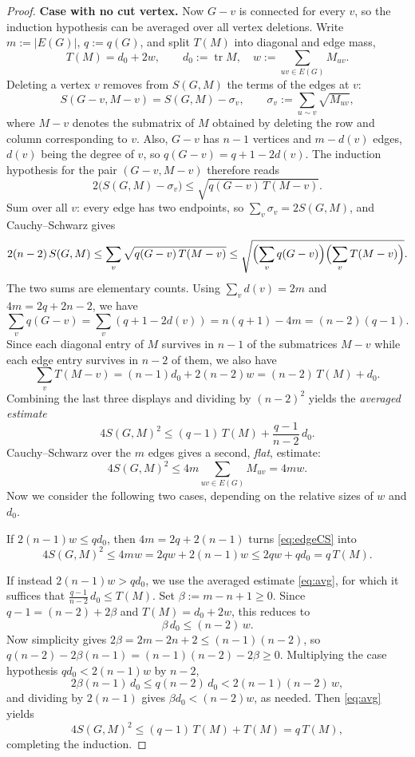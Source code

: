 \documentclass[11pt,letterpaper,reqno]{amsart}
\theoremstyle{definition}
\newcommand{\tr}{\operatorname{tr}}
\newcommand{\ppar}[1]{\par\addvspace{\medskipamount}\noindent{\bfseries #1.}\enspace\ignorespaces}
\begin{document}
\begin{proof}
\medskip
\noindent\textbf{Case with no cut vertex.}
Now $G-v$ is connected for every $v$, so the induction hypothesis can
be averaged over all vertex deletions.  Write $m:=|E(G)|$, $q:=q(G)$,
and split $T(M)$ into diagonal and edge mass,
\[
    T(M)=d_0+2w,
    \qquad
    d_0:=\tr M,
    \quad
    w:=\sum_{uv\in E(G)}M_{uv}.
\]
Deleting a vertex $v$ removes from $S(G,M)$ the terms of the edges at
$v$:
\[
    S(G-v,M-v)=S(G,M)-\sigma_v,
    \qquad
    \sigma_v:=\sum_{u\sim v}\sqrt{M_{uv}},
\]
where $M-v$ denotes the submatrix of $M$ obtained by deleting the row and column corresponding to $v$.  Also, $G-v$ has $n-1$
vertices and $m-d(v)$ edges, $d(v)$ being the degree of $v$, so
$q(G-v)=q+1-2d(v)$.  The induction hypothesis for the pair
$(G-v,M-v)$ therefore reads
\[
    2\bigl(S(G,M)-\sigma_v\bigr)\le\sqrt{q(G-v)\,T(M-v)}.
\]
Sum over all $v$: every edge has two endpoints, so
$\sum_v\sigma_v=2S(G,M)$, and Cauchy--Schwarz gives
\[
    2(n-2)\,S(G,M)
    \le\sum_v\sqrt{q(G-v)\,T(M-v)}
    \le\sqrt{\Bigl(\sum_v q(G-v)\Bigr)\Bigl(\sum_v T(M-v)\Bigr)}.
\]
The two sums are elementary counts.  Using $\sum_v d(v)=2m$ and
$4m=2q+2n-2$, we have
\[
    \sum_v q(G-v)= \sum_v (q + 1 - 2d(v)) = n(q+1)-4m=(n-2)(q-1).
\]
Since each diagonal entry of $M$ survives in $n-1$ of the
submatrices $M-v$ while each edge entry survives in $n-2$ of them, we also have
\[
    \sum_v T(M-v)=(n-1)d_0+2(n-2)w=(n-2)\,T(M)+d_0.
\]
Combining the last three displays and dividing by $(n-2)^2$ yields the
\emph{averaged estimate}
\begin{equation}\label{eq:avg}
    4S(G,M)^2\le(q-1)\,T(M)+\frac{q-1}{n-2}\,d_0.
\end{equation}
Cauchy--Schwarz over the $m$ edges gives a second, \emph{flat},
estimate:
\begin{equation}\label{eq:edgeCS}
    4S(G,M)^2\le4m\sum_{uv\in E(G)}M_{uv}=4mw.
\end{equation}
Now we consider the following two cases, depending on the relative sizes of $w$ and $d_0$.
\ppar{Case 1} If $2(n-1)w\le qd_0$, then $4m=2q+2(n-1)$ turns \eqref{eq:edgeCS} into
\[
    4S(G,M)^2\le4mw=2qw+2(n-1)w\le2qw+qd_0=q\,T(M).
\]
\ppar{Case 2} If instead $2(n-1)w>qd_0$, we use the averaged
estimate \eqref{eq:avg}, for which it suffices that
$\frac{q-1}{n-2}\,d_0\le T(M)$.  Set $\beta:=m-n+1\ge0$.  Since
$q-1=(n-2)+2\beta$ and $T(M)=d_0+2w$, this reduces to
\[
    \beta\,d_0\le(n-2)\,w.
\]
Now simplicity gives $2\beta=2m-2n+2\le(n-1)(n-2)$, so
$q(n-2)-2\beta(n-1)=(n-1)(n-2)-2\beta\ge0$.  Multiplying the case
hypothesis $qd_0<2(n-1)w$ by $n-2$,
\[
    2\beta(n-1)\,d_0\le q(n-2)\,d_0<2(n-1)(n-2)\,w,
\]
and dividing by $2(n-1)$ gives $\beta d_0<(n-2)w$, as needed.
Then \eqref{eq:avg} yields
\[
    4S(G,M)^2\le(q-1)\,T(M)+T(M)=q\,T(M),
\]
completing the induction.
\end{proof}
\end{document}
